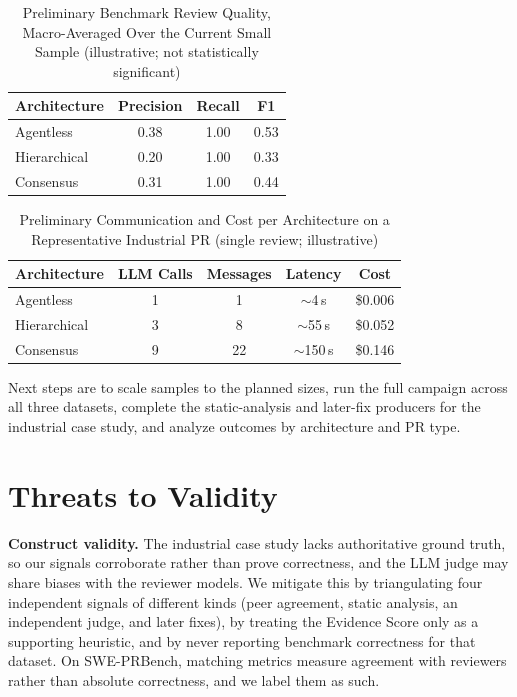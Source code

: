 \documentclass[conference]{IEEEtran}
\begin{document}
\begin{table}[t]
\caption{Preliminary Benchmark Review Quality, Macro-Averaged Over the Current
Small Sample (illustrative; not statistically significant)}
\label{tab:quality}
\centering
\begin{tabular}{@{}lccc@{}}
\toprule
\textbf{Architecture} & \textbf{Precision} & \textbf{Recall} & \textbf{F1} \\
\midrule
Agentless    & 0.38 & 1.00 & 0.53 \\
Hierarchical & 0.20 & 1.00 & 0.33 \\
Consensus    & 0.31 & 1.00 & 0.44 \\
\bottomrule
\end{tabular}
\end{table}

\begin{table}[t]
\caption{Preliminary Communication and Cost per Architecture on a Representative
Industrial PR (single review; illustrative)}
\label{tab:comm}
\centering
\begin{tabular}{@{}lcccc@{}}
\toprule
\textbf{Architecture} & \textbf{LLM Calls} & \textbf{Messages} &
\textbf{Latency} & \textbf{Cost} \\
\midrule
Agentless    & 1 & 1  & $\sim$4\,s   & \$0.006 \\
Hierarchical & 3 & 8  & $\sim$55\,s  & \$0.052 \\
Consensus    & 9 & 22 & $\sim$150\,s & \$0.146 \\
\bottomrule
\end{tabular}
\end{table}

Next steps are to scale samples to the planned sizes, run the full campaign across
all three datasets, complete the static-analysis and later-fix producers for the
industrial case study, and analyze outcomes by architecture and PR type.

\section{Threats to Validity}
\textbf{Construct validity.} The industrial case study lacks authoritative ground
truth, so our signals corroborate rather than prove correctness, and the LLM judge
may share biases with the reviewer models. We mitigate this by triangulating four
independent signals of different kinds (peer agreement, static analysis, an
independent judge, and later fixes), by treating the Evidence Score only as a
supporting heuristic, and by never reporting benchmark correctness for that
dataset. On SWE-PRBench, matching metrics measure agreement with reviewers rather
than absolute correctness, and we label them as such.
\end{document}
